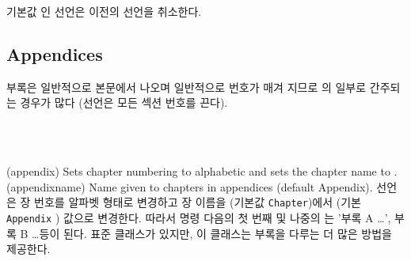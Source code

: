 기본값 인 \cmd{\normalbottomsection} 선언은 이전의 \cmd{\raggedbottomsection} 선언을 취소한다.
\subsection{Appendices} \label{sec:appendices}

부록은 일반적으로 본문에서 나오며 일반적으로 번호가 매겨 지므로 \cmd{\mainmatter}의 일부로 간주되는 경우가 많다 (\cmd{\backmatter}선언은 모든 섹션 번호를 끈다).

\begin{syntax}
\cmd{\appendix} \\
\cmd{\appendixname} \\
\end{syntax}
\glossary(appendix)%
  {}%
  {Sets chapter numbering to alphabetic and sets the chapter name to
   .}
\glossary(appendixname)%
  {}%
  {Name given to chapters in appendices (default Appendix).}
\cmd{\appendix} 선언은 장 번호를 알파벳 형태로 변경하고 장 이름을 \cmd{\chaptername} (기본값 \texttt{Chapter})에서 \cmd{\appendixname} (기본 \texttt{Appendix} ) 값으로 변경한다.
따라서 \cmd{\appendix} 명령 다음의 첫 번째 및 나중의 \cmd{\chapter}는 '부록 A \ldots', 부록 B \ldots 등이 된다.
표준 클래스가 있지만, 이 클래스는 부록을 다루는 더 많은 방법을 제공한다.

